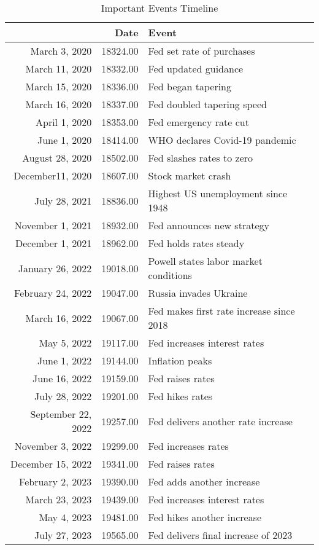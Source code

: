 \documentclass[
]{article}
\begin{document}
\begin{table}[ht]
\centering
\begin{tabular}{rrl}
  \hline
 & Date & Event \\ 
  \hline
March 3, 2020 & 18324.00 & Fed set rate of purchases \\ 
  March 11, 2020 & 18332.00 & Fed updated guidance \\ 
  March 15, 2020 & 18336.00 & Fed began tapering \\ 
  March 16, 2020 & 18337.00 & Fed doubled tapering speed \\ 
  April 1, 2020 & 18353.00 & Fed emergency rate cut \\ 
  June 1, 2020 & 18414.00 & WHO declares Covid-19 pandemic \\ 
  August 28, 2020 & 18502.00 & Fed slashes rates to zero \\ 
  December11, 2020 & 18607.00 & Stock market crash \\ 
  July 28, 2021 & 18836.00 & Highest US unemployment since 1948 \\ 
  November 1, 2021 & 18932.00 & Fed announces new strategy \\ 
  December 1, 2021 & 18962.00 & Fed holds rates steady \\ 
  January 26, 2022 & 19018.00 & Powell states labor market conditions \\ 
  February 24, 2022 & 19047.00 & Russia invades Ukraine \\ 
  March 16, 2022 & 19067.00 & Fed makes first rate increase since 2018 \\ 
  May 5, 2022 & 19117.00 & Fed increases interest rates \\ 
  June 1, 2022 & 19144.00 & Inflation peaks \\ 
  June 16, 2022 & 19159.00 & Fed raises rates \\ 
  July 28, 2022 & 19201.00 & Fed hikes rates \\ 
  September 22, 2022 & 19257.00 & Fed delivers another rate increase \\ 
  November 3, 2022 & 19299.00 & Fed increases rates \\ 
  December 15, 2022 & 19341.00 & Fed raises rates \\ 
  February 2, 2023 & 19390.00 & Fed adds another increase \\ 
  March 23, 2023 & 19439.00 & Fed increases interest rates \\ 
  May 4, 2023 & 19481.00 & Fed hikes another increase \\ 
  July 27, 2023 & 19565.00 & Fed delivers final increase of 2023 \\ 
   \hline
\end{tabular}
\caption{Important Events Timeline} 
\end{table}
\end{document}
